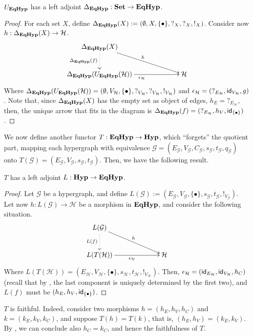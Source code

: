 \begin{proposition}
	$U_{\textbf{\textup{EqHyp}}}$ has a left adjoint $\Delta_{\textbf{\textup{EqHyp}}}: \mathbf{Set} \to \textbf{\textup{EqHyp}}$.
\end{proposition}

\begin{proof}
	For each set $X$, define $\Delta_{\textbf{\textup{EqHyp}}}(X):= (\emptyset, X, \{\bullet\}, ?_X, ?_X, !_X)$. Consider now $h: \Delta_{\textbf{\textup{EqHyp}}}(X) \to \mathcal{H}$.
	\[\xymatrix@C=2.3cm{
			\Delta_{\EqHyp}(X) \ar@{.>}[d]_{\Delta_\EqHyp(f)} \ar[dr]^{h} & \\
			\Delta_\EqHyp(U_{\EqHyp}(\mathcal{H})) \ar[r]_{\epsilon_{\mathcal{H}}} & \mathcal{H}
	}\]
	Where $\Delta_{\textbf{\textup{EqHyp}}}(U_{\textbf{\textup{EqHyp}}}(\mathcal{H})) = (\emptyset, V_\mathcal{H}, \{\bullet\}, ?_{V_\mathcal{H}}, ?_{V_\mathcal{H}}, !_{V_\mathcal{H}})$ and $\epsilon_{\mathcal{H}} = (?_{E_\mathcal{H}}, \mathsf{id}_{V_\mathcal{H}}, g)$.
	Note that, since $\Delta_{\textbf{\textup{EqHyp}}}(X)$ has the empty set as object of edges, $h_E = ?_{E_\mathcal{H}}$, then, the unique arrow that fits in the diagram is $\Delta_{\textbf{\textup{EqHyp}}}(f) = (?_{E_\mathcal{H}}, h_V, \mathsf{id}_{\{\bullet\}})$.

\end{proof}

We now define another functor $T: \textbf{\textup{EqHyp}} \to \textbf{\textup{Hyp}}$, which ``forgets'' the quotient part, mapping each hypergraph with equivalence $\mathcal{G} = (E_\mathcal{G}, V_{\mathcal{G}}, C_\mathcal{G}, s_\mathcal{G}, t_\mathcal{G}, q_\mathcal{G})$ onto $T(\mathcal{G})=(E_{\mathcal{G}}, V_{\mathcal{G}}, s_\mathcal{G}, t_{\mathcal{G}})$. Then, we have the following result.

\begin{proposition}
	$T$ has a left adjoint $L: \textbf{\textup{Hyp}} \to \textbf{\textup{EqHyp}}$.
\end{proposition}

\begin{proof}
	Let $\mathcal{G}$ be a hypergraph, and define $L(\mathcal{G}) := (E_\mathcal{G}, V_{\mathcal{G}}, \{\bullet\}, s_\mathcal{G}, t_\mathcal{G}, !_{V_\mathcal{G}})$. Let now $h: L(\mathcal{G})\to \mathcal{H}$ be a morphism in $\textbf{\textup{EqHyp}}$, and consider the following situation.
	\[\xymatrix@C=2.3cm{
		L(\mathcal{G}) \ar@{.>}[d]_{L(f)} \ar[dr]^{h}\\ L(T(\mathcal{H})) \ar[r]_{\epsilon_{\mathcal{H}}} & \mathcal{H}
	}\]
	Where $L(T(\mathcal{H}))=(E_\mathcal{H}, V_{\mathcal{H}}, \{\bullet\}, s_\mathcal{H}, t_\mathcal{H}, !_{V_\mathcal{H}})$. Then, $\epsilon_\mathcal{H} = (\mathsf{id}_{E_\mathcal{H}}, \mathsf{id}_{V_\mathcal{H}}, h_C)$ (recall that by , the last component is uniquely determined by the first two), and $L(f)$ must be $(h_E, h_V, \mathsf{id}_{\{\bullet\}})$.
\end{proof}

\begin{remark}
	$T$ is faithful. Indeed, consider two morphisms $h = (h_E, h_V, h_C)$ and $k = (k_E, k_V, k_C)$, and suppose $T(h) = T(k)$, that is, $(h_E, h_V) = (k_E, k_V)$.
	By , we can conclude also $h_C = k_C$, and hence the faithfulness of $T$.
\end{remark}





